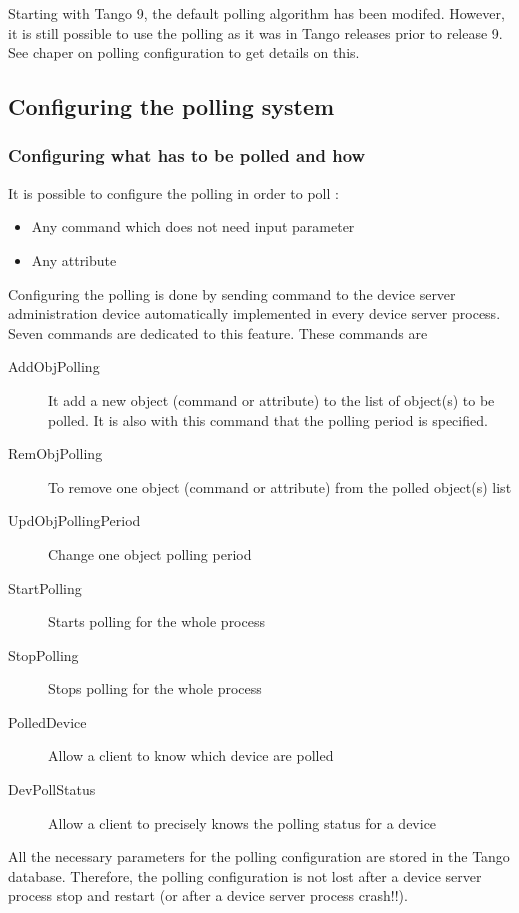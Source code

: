 Starting with Tango 9, the default polling algorithm has been modifed.
However, it is still possible to use the polling as it was in Tango
releases prior to release 9. See chaper on polling configuration to
get details on this.


\subsection{Configuring the polling system}


\subsubsection{Configuring what has to be polled and how}

It is possible to configure the polling in order to poll :
\begin{itemize}
\item Any command which does not need input parameter
\item Any attribute
\end{itemize}
Configuring the polling is done by sending command to the device server
administration device automatically implemented in every device server
process. Seven commands are dedicated to this feature. These commands
are
\begin{description}
\item [{AddObjPolling}] It add a new object (command
or attribute) to the list of object(s) to be polled. It is also with
this command that the polling period is specified.
\item [{RemObjPolling}] To remove one object (command
or attribute) from the polled object(s) list
\item [{UpdObjPollingPeriod}] Change one object
polling period
\item [{StartPolling}] Starts polling for the whole
process
\item [{StopPolling}] Stops polling for the whole process
\item [{PolledDevice}] Allow a client to know which
device are polled
\item [{DevPollStatus}] Allow a client to precisely
knows the polling status for a device
\end{description}
All the necessary parameters for the polling configuration are stored
in the Tango database. Therefore, the polling configuration is not
lost after a device server process stop and restart (or after a device
server process crash!!).

